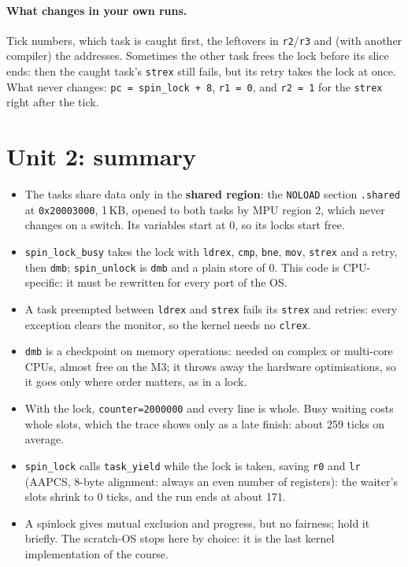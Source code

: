 \paragraph{What changes in your own runs.} Tick numbers, which task is caught first, the leftovers in \texttt{r2}/\texttt{r3} and (with another compiler) the addresses. Sometimes the other task frees the lock before its slice ends: then the caught task's \texttt{strex} still fails, but its retry takes the lock at once. What never changes: \texttt{pc = spin\_lock + 8}, \texttt{r1 = 0}, and \texttt{r2 = 1} for the \texttt{strex} right after the tick.

\section{Unit 2: summary}
\begin{itemize}
    \item The tasks share data only in the \textbf{shared region}: the \texttt{NOLOAD} section \texttt{.shared} at \texttt{0x20003000}, 1\,KB, opened to both tasks by MPU region 2, which never changes on a switch. Its variables start at 0, so its locks start free.
    \item \texttt{spin\_lock\_busy} takes the lock with \texttt{ldrex}, \texttt{cmp}, \texttt{bne}, \texttt{mov}, \texttt{strex} and a retry, then \texttt{dmb}; \texttt{spin\_unlock} is \texttt{dmb} and a plain store of 0. This code is CPU-specific: it must be rewritten for every port of the OS.
    \item A task preempted between \texttt{ldrex} and \texttt{strex} fails its \texttt{strex} and retries: every exception clears the monitor, so the kernel needs no \texttt{clrex}.
    \item \texttt{dmb} is a checkpoint on memory operations: needed on complex or multi-core CPUs, almost free on the M3; it throws away the hardware optimisations, so it goes only where order matters, as in a lock.
    \item With the lock, \texttt{counter=2000000} and every line is whole. Busy waiting costs whole slots, which the trace shows only as a late finish: about 259 ticks on average.
    \item \texttt{spin\_lock} calls \texttt{task\_yield} while the lock is taken, saving \texttt{r0} and \texttt{lr} (AAPCS, 8-byte alignment: always an even number of registers): the waiter's slots shrink to 0 ticks, and the run ends at about 171.
    \item A spinlock gives mutual exclusion and progress, but no fairness; hold it briefly. The scratch-OS stops here by choice: it is the last kernel implementation of the course.
\end{itemize}

